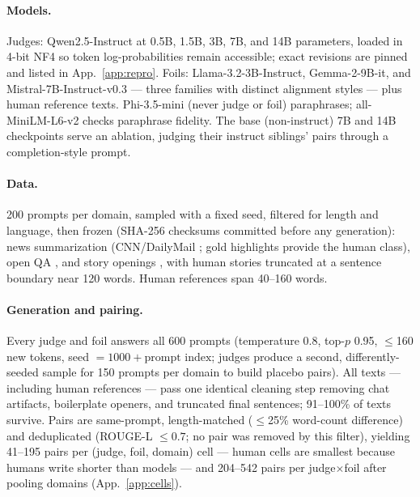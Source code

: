 \documentclass[11pt]{article}
\begin{document}
\paragraph{Models.}
Judges: Qwen2.5-Instruct at 0.5B, 1.5B, 3B, 7B, and 14B parameters, loaded
in 4-bit NF4 so token log-probabilities remain accessible; exact revisions
are pinned and listed in App.~\ref{app:repro}. Foils:
Llama-3.2-3B-Instruct, Gemma-2-9B-it, and Mistral-7B-Instruct-v0.3 ---
three families with distinct alignment styles --- plus human reference
texts. Phi-3.5-mini (never judge or foil) paraphrases; all-MiniLM-L6-v2
checks paraphrase fidelity. The base (non-instruct) 7B and 14B checkpoints
serve an ablation, judging their instruct siblings' pairs through a
completion-style prompt.

\paragraph{Data.}
200 prompts per domain, sampled with a fixed seed, filtered for length and
language, then frozen (SHA-256 checksums committed before any generation):
news summarization (CNN/DailyMail \citealp{hermann2015teaching}; gold
highlights provide the human class), open QA
\citep[Dolly-15k;][]{conover2023dolly}, and story openings
\citep[WritingPrompts;][]{fan2018hierarchical}, with human stories
truncated at a sentence boundary near 120 words. Human references span
40--160 words.

\paragraph{Generation and pairing.}
Every judge and foil answers all 600 prompts (temperature 0.8, top-$p$
0.95, $\leq$160 new tokens, seed $= 1000 + \text{prompt index}$; judges
produce a second, differently-seeded sample for 150 prompts per domain to
build placebo pairs). All texts --- including human references --- pass
one identical cleaning step removing chat artifacts, boilerplate openers,
and truncated final sentences; 91--100\% of texts survive. Pairs are
same-prompt, length-matched ($\leq$25\% word-count difference) and
deduplicated (ROUGE-L $\leq 0.7$; no pair was removed by this filter),
yielding 41--195 pairs per (judge, foil, domain) cell --- human cells are
smallest because humans write shorter than models --- and 204--542 pairs
per judge$\times$foil after pooling domains (App.~\ref{app:cells}).
\end{document}
